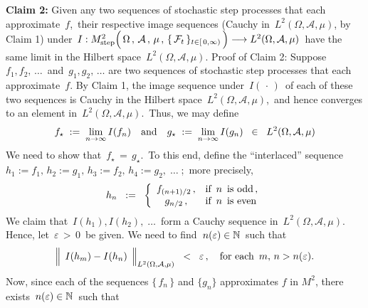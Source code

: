\begin{enumerate}
	\vskip 0.5cm
	\textbf{Claim 2:}\quad
	Given any two sequences of stochastic step processes that each approximate \,$f$,\,
	their respective image sequences (Cauchy in \,$L^{2}(\Omega,\mathcal{A},\mu)$, by Claim 1) under
	\,$I : M^{2}_{\textnormal{step}}\!
	\left(\,
		\overset{{\color{white}.}}{\Omega} \,,\, \mathcal{A} \,,\, \mu \,,\, \{\,\mathcal{F}_{t}\,\}_{t \in [\,0,\infty)}
		\,\right)\longrightarrow L^{2}(\Omega,\mathcal{A},\mu)$\,
	have the same limit in the Hilbert space \,$L^{2}(\Omega,\mathcal{A},\mu)$.
	\vskip 0.2cm
	\noindent
	Proof of Claim 2:\quad
	Suppose
	\,$f_{1}, f_{2}, \,\ldots$\, and \,$g_{1}, g_{2}, \,\ldots$\; are two sequences of stochastic step processes
	that each approximate \,$f$.
	By Claim 1, the image sequence under \,$I(\,\cdot\,)$\, of each of these two sequences
	is Cauchy in the Hilbert space \,$L^{2}(\Omega,\mathcal{A},\mu)$,\,
	and hence converges to an element in \,$L^{2}(\Omega,\mathcal{A},\mu)$.\,
	Thus, we may define
	\begin{equation*}
	f_{\star} \; := \; \underset{n\rightarrow\infty}{\lim}\,I(f_{n})
	\quad\textnormal{and}\quad
	g_{\star} \; := \; \underset{n\rightarrow\infty}{\lim}\,I(g_{n})
	\;\; \in \;\; L^{2}(\Omega,\mathcal{A},\mu)
	\end{equation*}
	We need to show that \,$f_{\star} \, = \, g_{\star}$.\,
	To this end, define the ``interlaced'' sequence
	\,$h_{1} := f_{1},\, h_{2} := g_{1},\, h_{3} := f_{2},\, h_{4} := g_{2},\;\ldots\;$;\,
	more precisely,
	\begin{equation*}
	h_{n} \;\; := \;\;
		\left\{\begin{array}{cl}
		f_{(n+1)/2}\,, & \textnormal{if \,$n$\, is odd}\,,
		\\
		g_{n/2}\,, & \textnormal{if \,$n$\, is even}
		\end{array}\right.
	\end{equation*}
	We claim that \,$I(h_{1}), I(h_{2}), \;\ldots$\, form a Cauchy sequence in \,$L^{2}(\Omega,\mathcal{A},\mu)$.\,
	Hence, let \,$\varepsilon \, > \, 0$\, be given. We need to find \,$n(\varepsilon) \in \mathbb{N}$\, such that
	\begin{equation*}
	\left\Vert\;\, I(h_{m}) \overset{{\color{white}.}}{-} I(h_{n}) \,\;\right\Vert_{L^{2}(\Omega,\mathcal{A},\mu)}
	\;\; < \;\; \varepsilon\,,
	\quad\textnormal{for each \,$m,\, n > n(\varepsilon)$}.
	\end{equation*}
	Now, since each of the sequences $\{\,f_{n}\,\}$ and $\{g_{n}\}$ approximates $f$ in $M^{2}$,
	there exists \,$n(\varepsilon) \in \mathbb{N}$\, such that
	\begin{equation*}

\end{equation*}
\end{enumerate}
